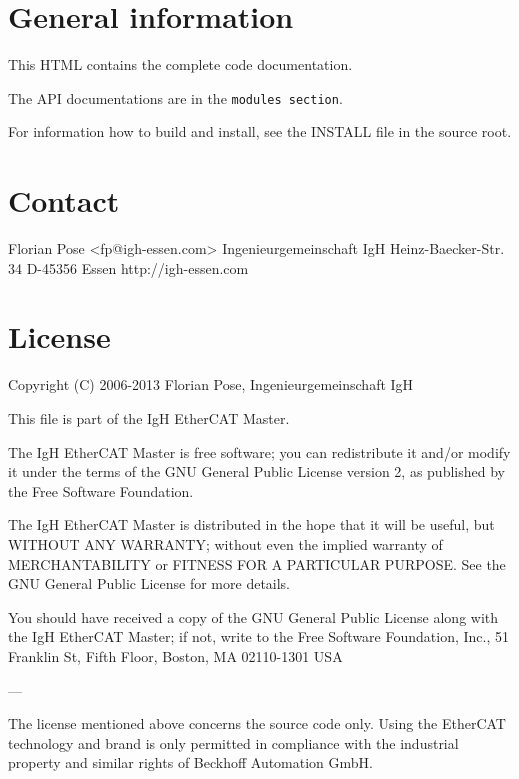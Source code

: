 \section{\-General information}\label{index_sec_general}
\-This \-H\-T\-M\-L contains the complete code documentation.

\-The \-A\-P\-I documentations are in the {\tt modules section}.

\-For information how to build and install, see the \-I\-N\-S\-T\-A\-L\-L file in the source root.\section{\-Contact}\label{index_sec_contact}
\begin{DoxyVerb}
   Florian Pose <fp@igh-essen.com>
   Ingenieurgemeinschaft IgH
   Heinz-Baecker-Str. 34
   D-45356 Essen
   http://igh-essen.com
   \end{DoxyVerb}
\section{\-License}\label{index_sec_license}
\begin{DoxyVerb}
   Copyright (C) 2006-2013  Florian Pose, Ingenieurgemeinschaft IgH

   This file is part of the IgH EtherCAT Master.

   The IgH EtherCAT Master is free software; you can redistribute it and/or
   modify it under the terms of the GNU General Public License version 2, as
   published by the Free Software Foundation.

   The IgH EtherCAT Master is distributed in the hope that it will be useful,
   but WITHOUT ANY WARRANTY; without even the implied warranty of
   MERCHANTABILITY or FITNESS FOR A PARTICULAR PURPOSE.  See the GNU General
   Public License for more details.

   You should have received a copy of the GNU General Public License along
   with the IgH EtherCAT Master; if not, write to the Free Software
   Foundation, Inc., 51 Franklin St, Fifth Floor, Boston, MA  02110-1301  USA

   ---

   The license mentioned above concerns the source code only. Using the
   EtherCAT technology and brand is only permitted in compliance with the
   industrial property and similar rights of Beckhoff Automation GmbH.
   \end{DoxyVerb}
 